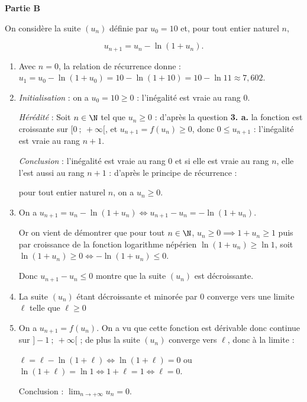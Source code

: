 \medskip

\textbf{Partie B}

\medskip

On considère la suite $\left(u_n\right)$ définie par $u_0 = 10$ et, pour tout entier naturel $n$,

\[u_{n+1} = u_n - \ln \left(1 + u_n\right).\]



\medskip

\begin{enumerate}
\item Avec $n = 0$, la relation de récurrence donne :
$u_1 = u_0 - \ln (1 + u_0) = 10 - \ln (1 + 10) = 10 - \ln 11 \approx 7,602$.


\item 

\emph{Initialisation } : on a $u_0 = 10 \geqslant 0$ : l'inégalité est vraie au rang 0.

\emph{Hérédité } : Soit $n \in \N$ tel que $u_n \geqslant 0$ : d'après la question \textbf{3. a.} la fonction est croissante sur $[0~;~+ \infty[$, et $u_{n+1} = f\left(u_n\right) \geqslant 0$, donc $0 \leqslant u_{n+1}$ : l'inégalité est vraie au rang $n + 1$.

\emph{Conclusion } : l'inégalité est vraie au rang 0 et si elle est vraie au rang $n$, elle l'est aussi au rang $n + 1$ : d'après le principe de récurrence :

pour tout entier naturel $n$, on a $u_n \geqslant 0$.
\item 
On a $u_{n+1} = u_n - \ln \left(1 + u_n\right) \iff u_{n+1} - u_n = - \ln \left(1 + u_n\right)$.

Or on vient de démontrer que pour tout $n \in \N$, \: $u_n \geqslant 0 \implies 1 + u_n \geqslant 1$ puis par croissance de la fonction logarithme népérien $\ln (1 + u_n) \geqslant \ln 1$, soit  $\ln (1 + u_n) \geqslant 0 \iff - \ln (1 + u_n) \leqslant 0$.

Donc $u_{n+1} - u_n \leqslant 0$ montre que la suite $\left(u_n\right)$ est décroissante.
\item 

La suite $\left(u_n\right)$ étant décroissante et minorée par $0$ converge vers une limite $\ell$ telle que $\ell \geqslant 0$
\item 
On a $u_{n+1} = f\left(u_n\right)$. On a vu que cette fonction est dérivable donc continue sur $]- 1~;~+ \infty[$ ; de plus la suite $\left(u_n\right)$ converge vers $\ell$, donc à la limite :

$\ell = \ell - \ln \left(1 + \ell\right) \iff \ln \left(1 + \ell\right) = 0$ ou $\ln \left(1 + \ell\right) = \ln 1 \iff 1 + \ell = 1 \iff \ell = 0$.

Conclusion : $\displaystyle\lim_{n \to + \infty} u_n = 0$.
\end{enumerate}

\medskip

\medskip
